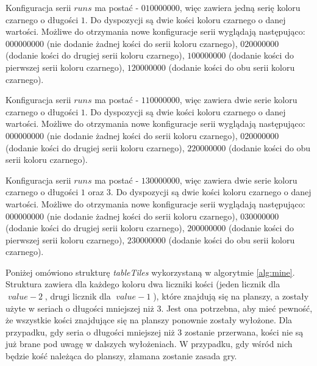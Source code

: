 \begin{example}
	Konfiguracja serii $runs$  ma postać - $010000000$, więc zawiera jedną serię koloru czarnego o długości $1$. Do dyspozycji są dwie kości koloru czarnego o danej wartości. Możliwe do otrzymania nowe konfiguracje serii wyglądają następująco: $000000000$ (nie dodanie żadnej kości do serii koloru czarnego), $020000000$ (dodanie kości do drugiej serii koloru czarnego), $100000000$ (dodanie kości do pierwszej serii koloru czarnego), $120000000$ (dodanie kości do obu serii koloru czarnego). 
\end{example}

\begin{example}
Konfiguracja serii $runs$  ma postać - $110000000$, więc zawiera dwie serie koloru czarnego o długości $1$. Do dyspozycji są dwie kości koloru czarnego o danej wartości. Możliwe do otrzymania nowe konfiguracje serii wyglądają następująco: $000000000$ (nie dodanie żadnej kości do serii koloru czarnego), $020000000$ (dodanie kości do drugiej serii koloru czarnego), $220000000$ (dodanie kości do obu serii koloru czarnego). 
\end{example}

\begin{example}
Konfiguracja serii $runs$  ma postać - $130000000$, więc zawiera dwie serie koloru czarnego o długości $1$ oraz $3$. Do dyspozycji są dwie kości koloru czarnego o danej wartości. Możliwe do otrzymania nowe konfiguracje serii wyglądają następująco: $000000000$ (nie dodanie żadnej kości do serii koloru czarnego), $030000000$ (dodanie kości do drugiej serii koloru czarnego), $200000000$ (dodanie kości do pierwszej serii koloru czarnego), $230000000$ (dodanie kości do obu serii koloru czarnego). 
\end{example}

Poniżej omówiono strukturę \emph{tableTiles}  wykorzystaną w algorytmie \ref{alg:mine}.
Struktura zawiera dla każdego koloru dwa liczniki kości (jeden licznik dla $\;value-2\;$, drugi licznik dla $\;value-1\;$), które znajdują się na planszy, a zostały użyte w seriach o długości mniejszej niż $3$. Jest ona potrzebna, aby mieć pewność, że wszystkie kości znajdujące się na planszy ponownie zostały wyłożone. Dla przypadku, gdy seria o długości mniejszej niż $3$ zostanie przerwana, kości nie są już brane pod uwagę w dalszych wyłożeniach. W przypadku, gdy wśród nich będzie kość należąca do planszy, złamana zostanie zasada gry. \\



